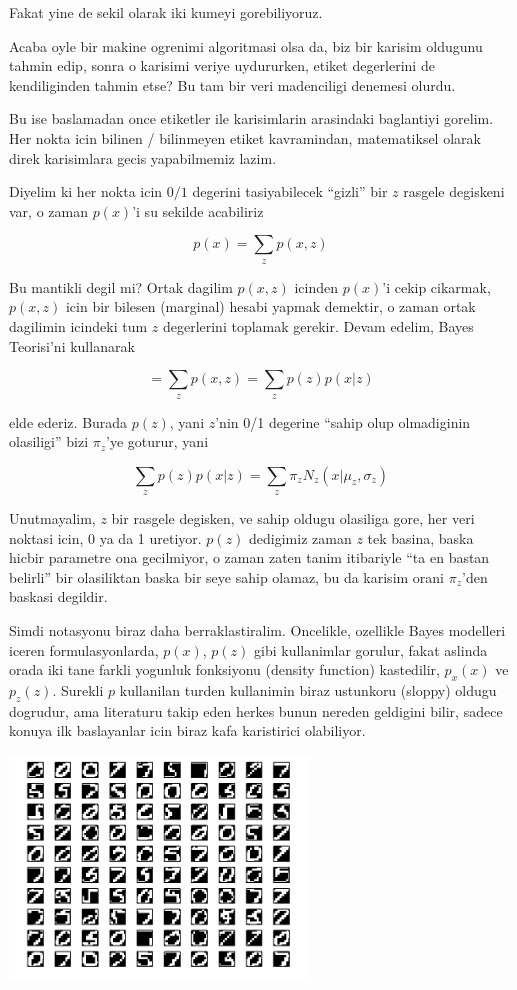\documentclass[12pt,fleqn]{article}\usepackage{../common}
\begin{document}
Fakat yine de sekil olarak iki kumeyi gorebiliyoruz. 

Acaba oyle bir makine ogrenimi algoritmasi olsa da, biz bir karisim
oldugunu tahmin edip, sonra o karisimi veriye uydururken, etiket
degerlerini de kendiliginden tahmin etse? Bu tam bir veri madenciligi
denemesi olurdu.

Bu ise baslamadan once etiketler ile karisimlarin arasindaki baglantiyi
gorelim. Her nokta icin bilinen / bilinmeyen etiket kavramindan,
matematiksel olarak direk karisimlara gecis yapabilmemiz lazim.

Diyelim ki her nokta icin $0/1$ degerini tasiyabilecek ``gizli'' bir $z$
rasgele degiskeni var, o zaman $p(x)$'i su sekilde acabiliriz

\[ p(x) = \sum_z p(x,z) \]

Bu mantikli degil mi? Ortak dagilim $p(x,z)$ icinden $p(x)$'i cekip
cikarmak, $p(x,z)$ icin bir bilesen (marginal) hesabi yapmak demektir, o
zaman ortak dagilimin icindeki tum $z$ degerlerini toplamak gerekir. Devam
edelim, Bayes Teorisi'ni kullanarak

\[ = \sum_z p(x,z) = \sum_z  p(z)p(x|z) \]

elde ederiz. Burada $p(z)$, yani $z$'nin 0/1 degerine ``sahip olup
olmadiginin olasiligi'' bizi $\pi_z$'ye goturur, yani

\[ \sum_z  p(z)p(x|z) = \sum_z  \pi_zN_z(x | \mu_z,\sigma_z) \]

Unutmayalim, $z$ bir rasgele degisken, ve sahip oldugu olasiliga gore, her
veri noktasi icin, 0 ya da 1 uretiyor. $p(z)$ dedigimiz zaman $z$ tek
basina, baska hicbir parametre ona gecilmiyor, o zaman zaten tanim
itibariyle ``ta en bastan belirli'' bir olasiliktan baska bir seye sahip
olamaz, bu da karisim orani $\pi_z$'den baskasi degildir. 

Simdi notasyonu biraz daha berraklastiralim. Oncelikle, ozellikle Bayes
modelleri iceren formulasyonlarda, $p(x)$, $p(z)$ gibi kullanimlar gorulur,
fakat aslinda orada iki tane farkli yogunluk fonksiyonu (density function)
kastedilir, $p_x(x)$ ve $p_z(z)$. Surekli $p$ kullanilan turden kullanimin
biraz ustunkoru (sloppy) oldugu dogrudur, ama literaturu takip eden herkes
bunun nereden geldigini bilir, sadece konuya ilk baslayanlar icin biraz kafa
karistirici olabiliyor.













\includegraphics[height=6cm]{digits.png}
\end{document}
